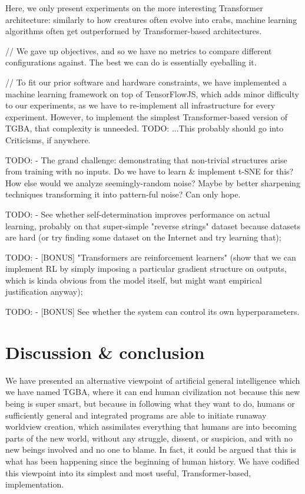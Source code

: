 \documentclass{article}
\begin{document}
Here, we only present experiments on the more interesting Transformer architecture: similarly to how creatures often evolve into crabs, machine learning algorithms often get outperformed by Transformer-based architectures.

// We gave up objectives, and so we have no metrics to compare different configurations against. The best we can do is essentially eyeballing it.

// To fit our prior software and hardware constraints, we have implemented a machine learning framework on top of TensorFlowJS, which adds minor difficulty to our experiments, as we have to re-implement all infrastructure for every experiment. However, to implement the simplest Transformer-based version of TGBA, that complexity is unneeded. TODO: ...This probably should go into Criticisms, if anywhere.

    TODO: - The grand challenge: demonstrating that non-trivial structures arise from training with no inputs. Do we have to learn & implement t-SNE for this? How else would we analyze seemingly-random noise? Maybe by better sharpening techniques transforming it into pattern-ful noise? Can only hope.

    TODO: - See whether self-determination improves performance on actual learning, probably on that super-simple "reverse strings" dataset because datasets are hard (or try finding some dataset on the Internet and try learning that);

    TODO: - [BONUS] "Transformers are reinforcement learners" (show that we can implement RL by simply imposing a particular gradient structure on outputs, which is kinda obvious from the model itself, but might want empirical justification anyway);

    TODO: - [BONUS] See whether the system can control its own hyperparameters.

\section{Discussion & conclusion}

We have presented an alternative viewpoint of artificial general intelligence which we have named TGBA, where it can end human civilization not because this new being is super smart, but because in following what they want to do, humans or sufficiently general and integrated programs are able to initiate runaway worldview creation, which assimilates everything that humans are into becoming parts of the new world, without any struggle, dissent, or suspicion, and with no new beings involved and no one to blame. In fact, it could be argued that this is what has been happening since the beginning of human history. We have codified this viewpoint into its simplest and most useful, Transformer-based, implementation.
\end{document}
